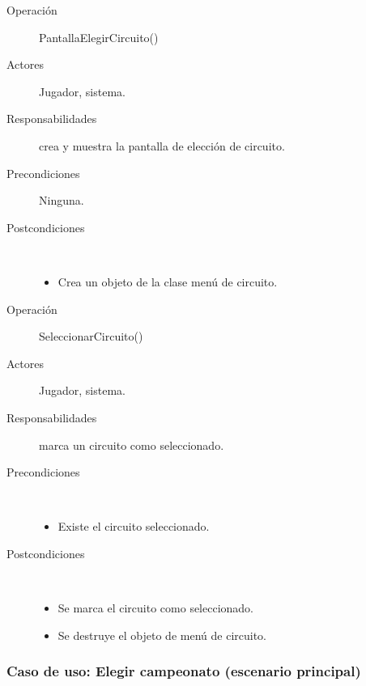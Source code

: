 \begin{description}
    \item [Operación] PantallaElegirCircuito()
    \item [Actores] Jugador, sistema.
    \item [Responsabilidades] crea y muestra la pantalla de elección de circuito.
    \item [Precondiciones] Ninguna.
    \item [Postcondiciones] $\quad$
        \begin{itemize}
            \item Crea un objeto de la clase menú de circuito.
        \end{itemize}
\end{description}

\begin{description}
    \item [Operación] SeleccionarCircuito()
    \item [Actores] Jugador, sistema.
    \item [Responsabilidades] marca un circuito como seleccionado.
    \item [Precondiciones] $\quad$
        \begin{itemize}
            \item Existe el circuito seleccionado.
        \end{itemize}
    \item [Postcondiciones] $\quad$
        \begin{itemize}
            \item Se marca el circuito como seleccionado.
            \item Se destruye el objeto de menú de circuito.
        \end{itemize}
\end{description}

\subsubsection{Caso de uso: Elegir campeonato (escenario principal)}

